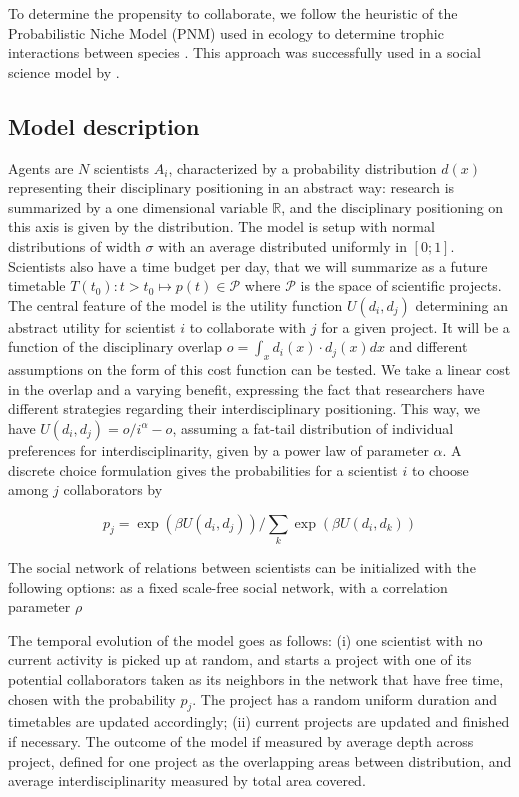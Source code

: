 \documentclass[utf8]{frontiersFPHY} %
\begin{document}
To determine the propensity to collaborate, we follow the heuristic of the Probabilistic Niche Model (PNM) used in ecology to determine trophic interactions between species \cite{williams2010probabilistic}. This approach was successfully used in a social science model by \cite{raimbault2020spatial}.


\subsection{Model description}

Agents are $N$ scientists $A_i$, characterized by a probability distribution $d(x)$ representing their disciplinary positioning in an abstract way: research is summarized by a one dimensional variable $\mathbb{R}$, and the disciplinary positioning on this axis is given by the distribution. The model is setup with normal distributions of width $\sigma$ with an average distributed uniformly in $\left[0;1\right]$. Scientists also have a time budget per day, that we will summarize as a future timetable $T(t_0):t>t_0 \mapsto p(t) \in \mathcal{P}$ where $\mathcal{P}$ is the space of scientific projects. The central feature of the model is the utility function $U(d_i,d_j)$ determining an abstract utility for scientist $i$ to collaborate with $j$ for a given project. It will be a function of the disciplinary overlap $o = \int_x d_i(x)\cdot d_j(x) dx$ and different assumptions on the form of this cost function can be tested. We take a linear cost in the overlap and a varying benefit, expressing the fact that researchers have different strategies regarding their interdisciplinary positioning. This way, we have $U(d_i,d_j) = o / i^\alpha - o$, assuming a fat-tail distribution of individual preferences for interdisciplinarity, given by a power law of parameter $\alpha$. A discrete choice formulation gives the probabilities for a scientist $i$ to choose among $j$ collaborators by 

\begin{equation}
p_j = \exp\left(\beta U(d_i,d_j) \right)/\sum_k \exp\left(\beta U(d_i,d_k) \right)
\end{equation}

The social network of relations between scientists can be initialized with the following options: as a fixed scale-free social network, with a correlation parameter $\rho$

The temporal evolution of the model goes as follows: (i) one scientist with no current activity is picked up at random, and starts a project with one of its potential collaborators taken as its neighbors in the network that have free time, chosen with the probability $p_j$. The project has a random uniform duration and timetables are updated accordingly; (ii) current projects are updated and finished if necessary. The outcome of the model if measured by average depth across project, defined for one project as the overlapping areas between distribution, and average interdisciplinarity measured by total area covered.
\end{document}
